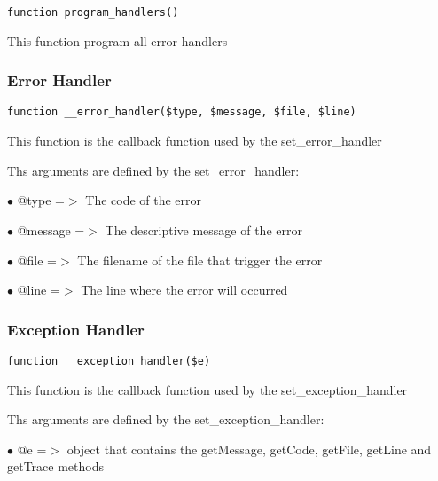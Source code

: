 \documentclass[a4paper]{article}
\begin{document}
\begin{lstlisting}
function program_handlers()
\end{lstlisting}

This function program all error handlers

\hypertarget{toc114}{}
\subsubsection{Error Handler}

\begin{lstlisting}
function __error_handler($type, $message, $file, $line)
\end{lstlisting}

This function is the callback function used by the set\_error\_handler

Ths arguments are defined by the set\_error\_handler:

\begin{compactitem}
\item[\color{myblue}$\bullet$] @type    =$>$ The code of the error
\item[\color{myblue}$\bullet$] @message =$>$ The descriptive message of the error
\item[\color{myblue}$\bullet$] @file    =$>$ The filename of the file that trigger the error
\item[\color{myblue}$\bullet$] @line    =$>$ The line where the error will occurred
\end{compactitem}

\hypertarget{toc115}{}
\subsubsection{Exception Handler}

\begin{lstlisting}
function __exception_handler($e)
\end{lstlisting}

This function is the callback function used by the set\_exception\_handler

Ths arguments are defined by the set\_exception\_handler:

\begin{compactitem}
\item[\color{myblue}$\bullet$] @e =$>$ object that contains the getMessage, getCode, getFile, getLine and getTrace
      methods
\end{compactitem}

\hypertarget{toc116}{}
\end{document}

